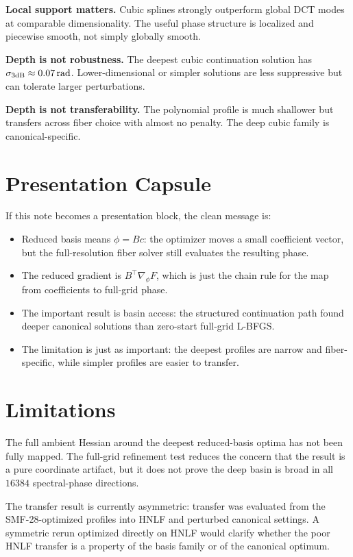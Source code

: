 \documentclass[11pt]{article}
\begin{document}
\textbf{Local support matters.} Cubic splines strongly outperform global DCT
modes at comparable dimensionality. The useful phase structure is localized and
piecewise smooth, not simply globally smooth.

\textbf{Depth is not robustness.} The deepest cubic continuation solution has
\(\sigma_{3\mathrm{dB}} \approx 0.07\,\mathrm{rad}\). Lower-dimensional or simpler
solutions are less suppressive but can tolerate larger perturbations.

\textbf{Depth is not transferability.} The polynomial profile is much shallower
but transfers across fiber choice with almost no penalty. The deep cubic family
is canonical-specific.

\section{Presentation Capsule}

If this note becomes a presentation block, the clean message is:
\begin{itemize}
    \item Reduced basis means \(\phi=Bc\): the optimizer moves a small coefficient vector, but the full-resolution fiber solver still evaluates the resulting phase.
    \item The reduced gradient is \(B^\top\nabla_\phi F\), which is just the chain rule for the map from coefficients to full-grid phase.
    \item The important result is basin access: the structured continuation path found deeper canonical solutions than zero-start full-grid L-BFGS.
    \item The limitation is just as important: the deepest profiles are narrow and fiber-specific, while simpler profiles are easier to transfer.
\end{itemize}

\section{Limitations}

The full ambient Hessian around the deepest reduced-basis optima has not been
fully mapped. The full-grid refinement test reduces the concern that the result
is a pure coordinate artifact, but it does not prove the deep basin is broad in
all \(16384\) spectral-phase directions.

The transfer result is currently asymmetric: transfer was evaluated from the
SMF-28-optimized profiles into HNLF and perturbed canonical settings. A symmetric
rerun optimized directly on HNLF would clarify whether the poor HNLF transfer is
a property of the basis family or of the canonical optimum.
\end{document}
